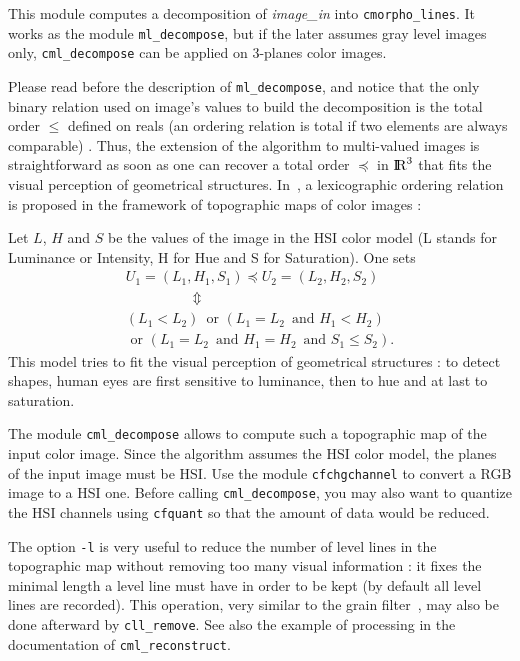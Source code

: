 \def\R{\hbox{I\kern-.2em\hbox{R}}}
\def\Leq{\preceq}

This module computes a decomposition of {\em image\_in}
into {\tt cmorpho\_lines}. 
It works as the module {\tt ml\_decompose}, but if the later 
assumes gray level images only, {\tt cml\_decompose} can be
applied on 3-planes color images.

Please read before the description of {\tt ml\_decompose}, and
notice that the only binary relation used on image's values to build
the decomposition is the total order $\leq$ defined on reals (an ordering 
relation is total if two elements are always comparable) . 
Thus, the extension of the algorithm to multi-valued images is straightforward
as soon as one can recover a total order $\Leq$ in $\R^3$ that fits the visual 
perception of geometrical structures. 
In~\cite{coll.froment:topographic}, a lexicographic ordering
relation is proposed in the framework of topographic maps of color images :

Let $L$, $H$ and $S$ be the values of the image in the HSI color model
(L stands for Luminance or Intensity, H for Hue and S for Saturation). One sets
\begin{equation}
\begin{array}{l}
\label{lexicographic_order}
U_1 = (L_1,H_1,S_1) \Leq U_2 = (L_2,H_2,S_2) \\
\hspace{2cm}\Updownarrow \\
(L_1 < L_2)  \,\mbox{ or } (L_1=L_2 \,\mbox{ and } H_1 < H_2) \\
\mbox{ or } (L_1=L_2 \,\mbox{ and } H_1=H_2 \,\mbox{ and } S_1 \leq S_2).
\end{array}
\end{equation}
This model tries to fit the visual perception of geometrical structures :
to detect shapes, human eyes are first sensitive
to luminance, then to hue and at last to saturation.

The module {\tt cml\_decompose} allows to compute such a topographic map of the
input color image. Since the algorithm assumes the HSI color model, the planes
of the input image must be HSI. Use the module {\tt cfchgchannel} to convert
a RGB image to a HSI one. Before calling {\tt cml\_decompose}, you may also
want to quantize the HSI channels using {\tt cfquant} so that the amount of
data would be reduced. 

The option {\tt -l} is very useful to reduce the number of level lines in the
topographic map without removing too many visual information : it fixes the
minimal length a level line must have in order to be kept (by default all
level lines are recorded). This operation, very similar to the grain 
filter~, may also be done afterward by {\tt cll\_remove}.
See also the example of processing in the documentation of {\tt cml\_reconstruct}.

